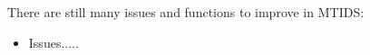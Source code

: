 \documentclass[a4paper,twoside, openright,12pt]{report}
\begin{document}
There are still many issues and functions to improve in MTIDS:
\begin{itemize}
 \item Issues.....
\end{itemize}

%


\cleardoublepage
{} 
\listoffigures 	 %

% 
% 
% 


\end{document}
